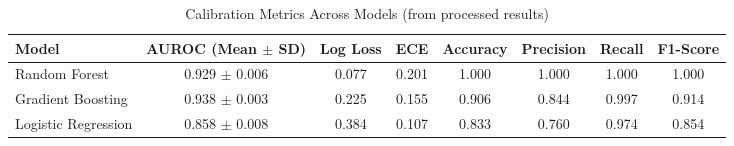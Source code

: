 \begin{table}[htbp]
\centering
\caption{Calibration Metrics Across Models (from processed results)}
\label{tab:calibration_metrics_processed}
\begin{tabular}{@{}lccccccc@{}}
\toprule
\textbf{Model} & \textbf{AUROC (Mean $\pm$ SD)} & \textbf{Log Loss} & \textbf{ECE} & \textbf{Accuracy} & \textbf{Precision} & \textbf{Recall} & \textbf{F1-Score} \\ \midrule
Random Forest & 0.929 $\pm$ 0.006 & 0.077 & 0.201 & 1.000 & 1.000 & 1.000 & 1.000 \\
Gradient Boosting & 0.938 $\pm$ 0.003 & 0.225 & 0.155 & 0.906 & 0.844 & 0.997 & 0.914 \\
Logistic Regression & 0.858 $\pm$ 0.008 & 0.384 & 0.107 & 0.833 & 0.760 & 0.974 & 0.854 \\
\bottomrule
\end{tabular}
\end{table}

